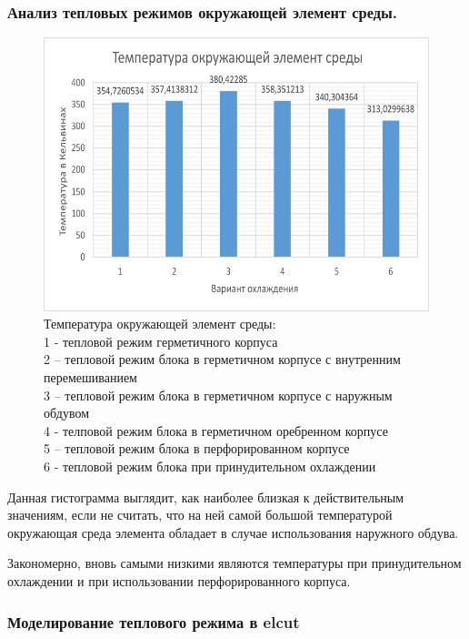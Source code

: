 \subsubsection{ Анализ тепловых режимов окружающей элемент среды.}
\begin{figure}[h] %
\begin{center}
  \includegraphics[scale = 0.4]{images2/t_env.png}
  \end{center}
\caption{Температура окружающей элемент среды:\\
  1 - тепловой режим герметичного корпуса\\
  2 – тепловой режим блока в герметичном корпусе с внутренним перемешиванием\\
  3 – тепловой режим блока в герметичном корпусе с наружным обдувом\\
  4 - телповой режим блока в  герметичном оребренном корпусе \\
  5 – тепловой режим блока в перфорированном корпусе \\
  6 - тепловой режим блока при принудительном охлаждении}

\end{figure}

Данная гистограмма выглядит, как наиболее близкая к действительным
значениям, если не считать, что на ней самой большой температурой
окружающая среда элемента обладает в случае использования наружного
обдува.

Закономерно, вновь самыми низкими являются температуры при принудительном охлаждении
и при использовании перфорированного корпуса.


\subsubsection{Моделирование теплового режима в elcut}

